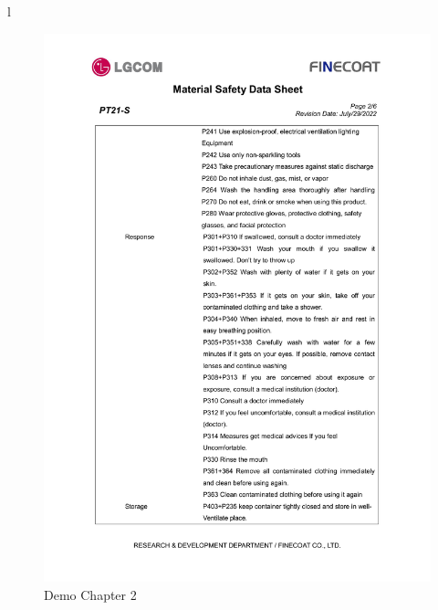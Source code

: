 l\documentclass[a4paper,12pt,twoside]{report}
\begin{document}
\begin{figure}[H]
		\includegraphics[width=\textwidth, keepaspectratio]{images/chaps2}
	\caption[Demo Chapter 2 .ctd]{Demo Chapter 2}
\label{chaps2}
\end{figure}
\end{document}
